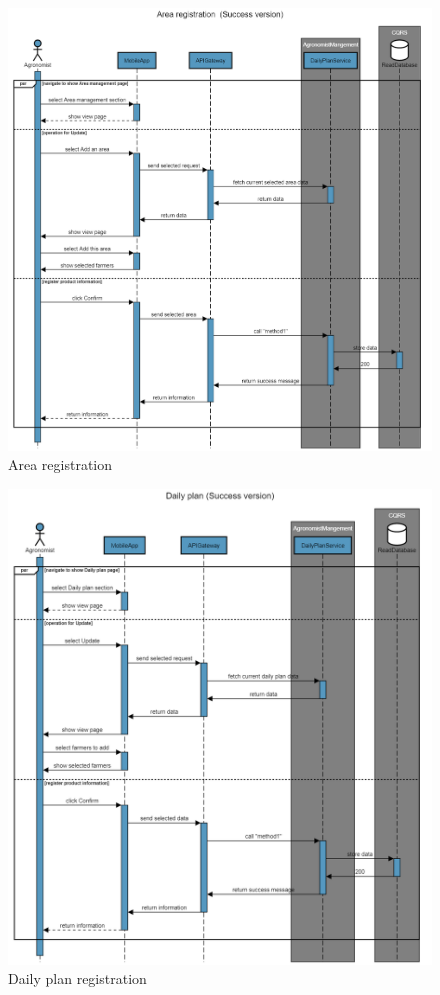 \begin{figure}[H]
	\centering
    \includegraphics[width=\textwidth]{Images/sequence-diagram/area-registration.png}
	\caption{\label{fig:se_area}Area registration}
\end{figure}

\begin{figure}[H]
	\centering
    \includegraphics[width=\textwidth]{Images/sequence-diagram/daily-plan.png}
	\caption{\label{fig:se_daily}Daily plan registration}
\end{figure}